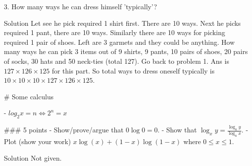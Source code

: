 \documentclass[a4paper,10pt]{article}
\begin{document}
3. How many ways he can dress himself 'typically'?

Solution Let see he pick required 1 shirt first. There are 10 ways. Next he
picks required 1 pant, there are 10 ways. Similarly there are 10 ways for
picking required 1 pair of shoes. Left are 3 garmets and they could be anything.
How many ways he can pick 3 items out of 9 shirts, 9 pants, 10 pairs of shoes,
20 pairs of socks, 30 hats and 50 neck-ties (total 127). Go back to problem 1. Ans is 
$127 \times 126 \times 125$ for this part. So total ways to dress oneself
typically is $10 \times 10 \times 10 \times 127 \times 126 \times 125$.

# Some calculus

- $log_2 x = n \iff 2^n = x$

### 5 points
- Show/prove/argue that $0 \log 0 = 0$.
- Show that $\log_x y = \frac{\log_a y}{\log_a x}$.
- Plot (show your work) $x \log(x) + (1-x) \log (1-x)$ where $0 \le x \le 1$.

Solution Not given.
\end{document}
